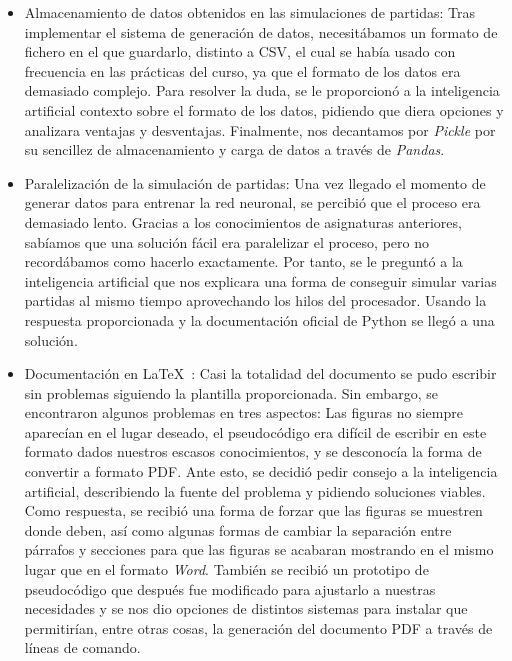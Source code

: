 \documentclass[conference,a4paper]{IEEEtran}
\begin{document}
\begin{itemize}
\item Almacenamiento de datos obtenidos en las simulaciones de partidas: Tras implementar el sistema de generación de datos, necesitábamos un formato de fichero en el que guardarlo, distinto a CSV, el cual se había usado con frecuencia en las prácticas del curso, ya que el formato de los datos era demasiado complejo. Para resolver la duda, se le proporcionó a la inteligencia artificial contexto sobre el formato de los datos, pidiendo que diera opciones y analizara ventajas y desventajas. Finalmente, nos decantamos por \emph{Pickle} por su sencillez de almacenamiento y carga de datos a través de \emph{Pandas}.
\item Paralelización de la simulación de partidas: Una vez llegado el momento de generar datos para entrenar la red neuronal, se percibió que el proceso era demasiado lento. Gracias a los conocimientos de asignaturas anteriores, sabíamos que una solución fácil era paralelizar el proceso, pero no recordábamos como hacerlo exactamente. Por tanto, se le preguntó a la inteligencia artificial que nos explicara una forma de conseguir simular varias partidas al mismo tiempo aprovechando los hilos del procesador. Usando la respuesta proporcionada y la documentación oficial de Python se llegó a una solución.
\item Documentación en LaTeX~\cite{b17}: Casi la totalidad del documento se pudo escribir sin problemas siguiendo la plantilla proporcionada. Sin embargo, se encontraron algunos problemas en tres aspectos: Las figuras no siempre aparecían en el lugar deseado, el pseudocódigo era difícil de escribir en este formato dados nuestros escasos conocimientos, y se desconocía la forma de convertir a formato PDF. Ante esto, se decidió pedir consejo a la inteligencia artificial, describiendo la fuente del problema y pidiendo soluciones viables. Como respuesta, se recibió una forma de forzar que las figuras se muestren donde deben, así como algunas formas de cambiar la separación entre párrafos y secciones para que las figuras se acabaran mostrando en el mismo lugar que en el formato \emph{Word}. También se recibió un prototipo de pseudocódigo que después fue modificado para ajustarlo a nuestras necesidades y se nos dio opciones de distintos sistemas para instalar que permitirían, entre otras cosas, la generación del documento PDF a través de líneas de comando.
\end{itemize}
\end{document}
